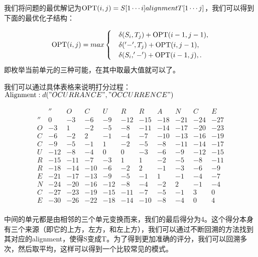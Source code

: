 \documentclass[UTF8,a4paper]{ctexart}
\begin{document}
\begin{itemize}
  我们将问题的最优解记为${\rm{OPT}}(i,j)=S[1\cdots i] alignment T[1\cdots j]$，我们可以得到下面的最优化子结构：

  \[
  {\rm{OPT}}(i,j)=max\begin{cases}
                       & \delta(S_i,T_j)+{\rm{OPT}}(i-1,j-1), \\
                       & \delta('-',T_j)+{\rm{OPT}}(i,j-1), \\
                       & \delta(S_i,'-')+{\rm{OPT}}(i-1,j), .
                     \end{cases}
  \]
  即枚举当前单元的三种可能，在其中取最大值就可以了。

  我们可以通过具体表格来说明打分过程： \\
  ${\rm{Alignment}}: d("OCURRANCE","OCCURRENCE")$

  \[
\begin{array}{ccccccccccc}
           & ''  & O   & C   & U   & R   & R   & A   & N   & C   & E   \\
        '' & 0   & -3  & -6  & -9  & -12 & -15 & -18 & -21 & -24 & -27 \\
        O  & -3  & 1   & -2  & -5  & -8  & -11 & -14 & -17 & -20 & -23 \\
        C  & -6  & -2  & 2   & -1  & -4  & -7  & -10 & -13 & -16 & -19 \\
        C  & -9  & -5  & -1  & 1   & -2  & -5  & -8  & -11 & -14 & -17 \\
        U  & -12 & -8  & -4  & 0   & 0   & -3  & -6  & -9  & -12 & -15 \\
        R  & -15 & -11 & -7  & -3  & 1   & 1   & -2  & -5  & -8  & -11 \\
        R  & -18 & -14 & -10 & -6  & -2  & 2   & -1  & -3  & -6  & -9  \\
        E  & -21 & -17 & -13 & -9  & -5  & -1  & 1   & -1  & -4  & -7  \\
        N  & -24 & -20 & -16 & -12 & -8  & -4  & -2  & 2   & -1  & -4  \\
        C  & -27 & -23 & -19 & -15 & -11 & -7  & -5  & -1  & 3   & 0   \\
        E  & -30 & -26 & -22 & -18 & -14 & -10 & -8  & -4  & 0   & 4 \\
\end{array}
  \]

  中间的单元都是由相邻的三个单元变换而来，我们的最后得分为4。这个得分本身有三个来源（即它的上方，左方，和左上方），我们可以通过不断回溯的方法找到其对应的alignment，使得S变成T。为了得到更加准确的评分，我们可以回溯多次，然后取平均，这样可以得到一个比较常见的模式。


\end{itemize}
\end{document}
